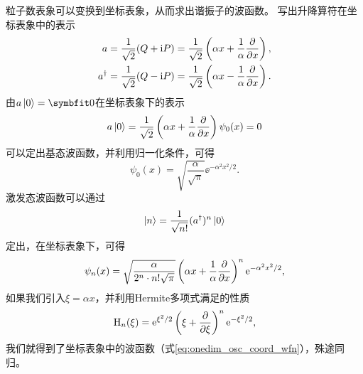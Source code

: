 粒子数表象可以变换到坐标表象，从而求出谐振子的波函数。
写出升降算符在坐标表象中的表示
\begin{equation}
\begin{aligned}
    a       &= \frac{1}{\sqrt{2}}(Q+\mathrm{i} P) = \frac{1}{\sqrt{2}}\left(\alpha x + \frac{1}{\alpha}\frac{\partial}{\partial x} \right), \\
    a^\dagger  &= \frac{1}{\sqrt{2}}(Q-\mathrm{i} P) = \frac{1}{\sqrt{2}}\left(\alpha x - \frac{1}{\alpha}\frac{\partial}{\partial x} \right).
\end{aligned}
\end{equation}
由$a\ket{0}=\bm{0}$在坐标表象下的表示
\begin{equation}
    a\ket{0} = \frac{1}{\sqrt{2}}\left(\alpha x + \frac{1}{\alpha}\frac{\partial}{\partial x} \right) \psi_0(x) = 0
\end{equation}
可以定出基态波函数，并利用归一化条件，可得
\begin{equation}
    \psi_0(x) = \sqrt{\frac{\alpha}{\sqrt{\pi}}} \ee^{-\alpha^2 x^2/2}.
\end{equation}
激发态波函数可以通过
\begin{equation}
    \ket{n} = \frac{1}{\sqrt{n!}} (a^\dagger)^n \ket{0}
\end{equation}
定出，在坐标表象下，可得
\begin{equation}
    \psi_n(x) = \sqrt{\frac{\alpha}{2^n\cdot n! \sqrt{\pi}}} \left( \alpha x + \frac{1}{\alpha}\frac{\partial}{\partial x} \right)^n \mathrm{e}^{-\alpha^2 x^2/2},
\end{equation}
如果我们引入$\xi=\alpha x$，并利用Hermite多项式满足的性质
\begin{equation}
    \mathrm{H}_n(\xi) = \mathrm{e}^{\xi^2/2} \left( \xi + \frac{\partial}{\partial \xi} \right)^n \mathrm{e}^{-\xi^2/2},
\end{equation}
我们就得到了坐标表象中的波函数（式\eqref{eq:onedim_osc_coord_wfn}），殊途同归。
